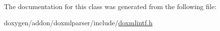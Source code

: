 The documentation for this class was generated from the following file\+:\begin{DoxyCompactItemize}
\item 
doxygen/addon/doxmlparser/include/\mbox{\hyperlink{include_2doxmlintf_8h}{doxmlintf.\+h}}\end{DoxyCompactItemize}
